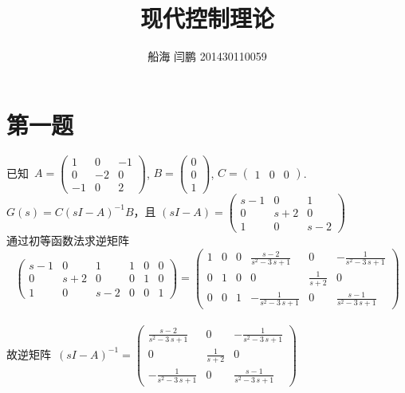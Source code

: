 \documentclass[a4paper]{article}
\begin{document}
\title{现代控制理论}
\author{船海 闫鹏 201430110059}
\date{}
\maketitle
\noindent
\section*{第一题}
\mbox{已知 }$ A=\left(\begin{array}{ccc} 1 & 0 & -1\\ 0 & -2 & 0\\ -1 & 0 & 2 \end{array}\right) $,
$ B=\left(\begin{array}{c} 0\\ 0\\ 1 \end{array}\right) $,  $ C=\left(\begin{array}{ccc} 1 & 0 & 0 \end{array}\right)$. \\
$ G(s)=C(sI-A)^{-1}B $，\mbox{且}
$ (sI-A)=\left(\begin{array}{ccc} s - 1 & 0 & 1\\ 0 & s + 2 & 0\\ 1 & 0 & s - 2 \end{array}\right) $ \\
\mbox{通过初等函数法求逆矩阵} \\
\begin{displaymath}
\left(\begin{array}{cccccc} s - 1 & 0 & 1 & 1 & 0 & 0\\ 0 & s + 2 & 0 & 0 & 1 & 0\\ 1 & 0 & s - 2 & 0 & 0 & 1 \end{array}\right) = \left(\begin{array}{cccccc} 1 & 0 & 0 & \frac{s - 2}{s^2 - 3\, s + 1} & 0 & -\frac{1}{s^2 - 3\, s + 1}\\ 0 & 1 & 0 & 0 & \frac{1}{s + 2} & 0\\ 0 & 0 & 1 & -\frac{1}{s^2 - 3\, s + 1} & 0 & \frac{s - 1}{s^2 - 3\, s + 1} \end{array}\right)
\end{displaymath} \\
\mbox{故逆矩阵 }$(sI-A)^{-1}= \left(\begin{array}{ccc} \frac{s - 2}{s^2 - 3\, s + 1} & 0 & -\frac{1}{s^2 - 3\, s + 1}\\ 0 & \frac{1}{s + 2} & 0\\ -\frac{1}{s^2 - 3\, s + 1} & 0 & \frac{s - 1}{s^2 - 3\, s + 1} \end{array}\right) $ \\
\end{document}
